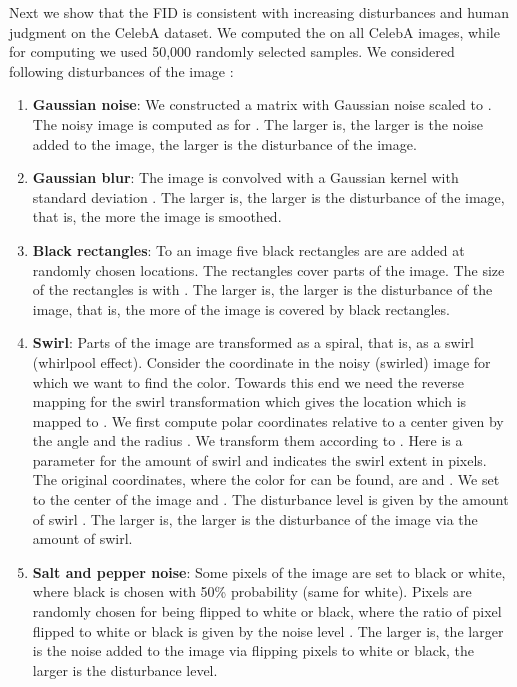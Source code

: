 \documentclass{article}
\begin{document}
Next we show that the FID is consistent with
increasing disturbances and human judgment on the CelebA dataset.
We computed the  on all CelebA images, while
for computing  we used 50,000 randomly selected samples.
We considered following disturbances of the image :
\begin{enumerate}
\item {\bf Gaussian noise}: We constructed a matrix  with Gaussian
noise scaled to . The noisy image is computed as
 for .
The larger  is, the larger is the noise added to the image,
the larger is the disturbance of the image.

\item {\bf Gaussian blur}: The image is convolved with a Gaussian
kernel with standard deviation .
The larger  is, the larger is the disturbance of the image, that is,
the more the image is smoothed.

\item {\bf Black rectangles}: To an image five black rectangles are
are added at randomly chosen locations.
The rectangles cover parts of the image. The size of the rectangles
is  with  .
The larger  is, the larger is the disturbance of the image,
that is, the more of the image is covered by black rectangles.

\item {\bf Swirl}: Parts of the image are transformed as a
spiral, that is, as a swirl (whirlpool effect).
Consider the coordinate  in the noisy (swirled) image for
which we want to find the color. Towards this end we need the
reverse mapping for the swirl transformation which gives the location
which is mapped to .
We first compute polar coordinates
relative to a center  given by the angle
 and the radius
.
We transform them according to
.
Here  is a parameter for the amount of swirl and
 indicates the swirl extent in pixels.
The original coordinates, where the color for  can be found,
are
 and
.
We set  to
the center of the image and .
The disturbance level is given by the amount of swirl
.
The larger  is, the larger is the disturbance of the image via the
amount of swirl.


\item {\bf Salt and pepper noise}:
Some pixels of the image are set to black or white, where black is
chosen with 50\% probability (same for white). Pixels are randomly
chosen for being flipped to white or black, where the ratio of pixel
flipped to white or black is given by the noise level
.
The larger  is, the larger is the noise added to the image
via flipping pixels to white or black, the larger is the disturbance level.


\end{enumerate}
\end{document}
